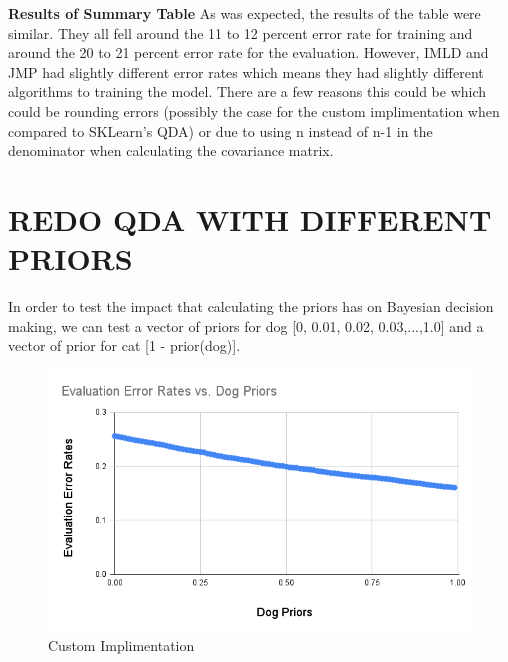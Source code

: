 \documentclass{article}
\begin{document}
\begin{flushleft}
\break
\textbf{Results of Summary Table}\break
\break
As was expected, the results of the table were similar. They all fell around the 11 to 12 percent error rate for training and around the 20 to 21 percent error rate for the evaluation. However, IMLD and JMP had slightly different error rates which means they had slightly different algorithms to training the model. There are a few reasons this could be which could be rounding errors (possibly the case for the custom implimentation when compared to SKLearn's QDA) or due to using n instead of n-1 in the denominator when calculating the covariance matrix.  
\section{\MakeUppercase{Redo QDA With Different Priors}}
In order to test the impact that calculating the priors has on Bayesian decision making, we can test a vector of priors for dog [0, 0.01, 0.02, 0.03,...,1.0] and a vector of prior for cat [1 - prior(dog)].\break
\begin{figure}[!htb]
        \centering
        \begin{minipage}{0.49\textwidth}
                \centering
                \includegraphics[width=1\linewidth]{../Custom_Implimentation_Evaluation_Error_Rates_vs_Dog_Priors.png}
                \caption{Custom Implimentation}
        \end{minipage}
\end{figure}
\break
\end{flushleft}
\end{document}
